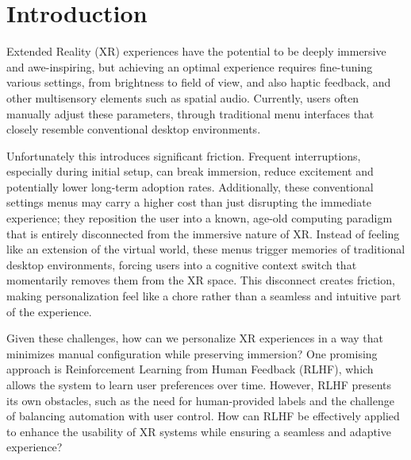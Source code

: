\section{Introduction}

Extended Reality (XR) experiences have the potential to be deeply immersive and awe-inspiring, but achieving an optimal experience requires fine-tuning various settings, from brightness to field of view, and also haptic feedback, and other multisensory elements such as spatial audio. Currently, users often manually adjust these parameters, through traditional menu interfaces that closely resemble conventional desktop environments. 

Unfortunately this introduces significant friction. Frequent interruptions, especially during initial setup, can break immersion, reduce excitement and potentially lower long-term adoption rates. Additionally, these conventional settings menus may carry a higher cost than just disrupting the immediate experience; they reposition the user into a known, age-old computing paradigm that is entirely disconnected from the immersive nature of XR. Instead of feeling like an extension of the virtual world, these menus trigger memories of traditional desktop environments, forcing users into a cognitive context switch that momentarily removes them from the XR space. This disconnect creates friction, making personalization feel like a chore rather than a seamless and intuitive part of the experience.

Given these challenges, how can we personalize XR experiences in a way that minimizes manual configuration while preserving immersion? One promising approach is Reinforcement Learning from Human Feedback (RLHF), which allows the system to learn user preferences over time. However, RLHF presents its own obstacles, such as the need for human-provided labels and the challenge of balancing automation with user control. How can RLHF be effectively applied to enhance the usability of XR systems while ensuring a seamless and adaptive experience?

